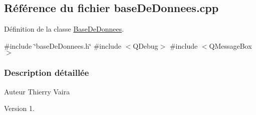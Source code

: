 \hypertarget{ihm-estock_2base_de_donnees_8cpp}{}\subsection{Référence du fichier base\+De\+Donnees.\+cpp}
\label{ihm-estock_2base_de_donnees_8cpp}


Définition de la classe \hyperlink{class_base_de_donnees}{Base\+De\+Donnees}.  


{\ttfamily \#include \char`\"{}base\+De\+Donnees.\+h\char`\"{}}\newline
{\ttfamily \#include $<$Q\+Debug$>$}\newline
{\ttfamily \#include $<$Q\+Message\+Box$>$}\newline


\subsubsection{Description détaillée}
\begin{DoxyAuthor}{Auteur}
Thierry Vaira
\end{DoxyAuthor}
\begin{DoxyVersion}{Version}
1. 
\end{DoxyVersion}
